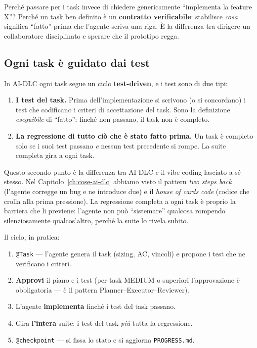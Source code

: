 Perché passare per i task invece di chiedere genericamente ``implementa la feature X''? Perché un task ben definito è un \textbf{contratto verificabile}: stabilisce \textit{cosa} significa ``fatto'' prima che l'agente scriva una riga. È la differenza tra dirigere un collaboratore disciplinato e sperare che il prototipo regga.

\subsection*{Ogni task è guidato dai test}

In AI-DLC ogni task segue un ciclo \textbf{test-driven}, e i test sono di due tipi:

\begin{enumerate}
  \item \textbf{I test del task.} Prima dell'implementazione si scrivono (o si concordano) i test che codificano i criteri di accettazione del task. Sono la definizione \textit{eseguibile} di ``fatto'': finché non passano, il task non è completo.
  \item \textbf{La regressione di tutto ciò che è stato fatto prima.} Un task è completo solo se i suoi test passano \textit{e} nessun test precedente si rompe. La suite completa gira a ogni task.
\end{enumerate}

Questo secondo punto è la differenza tra AI-DLC e il vibe coding lasciato a sé stesso. Nel Capitolo~\ref{ch:cose-ai-dlc} abbiamo visto il pattern \textit{two steps back} (l'agente corregge un bug e ne introduce due) e il \textit{house of cards code} (codice che crolla alla prima pressione). La regressione completa a ogni task è proprio la barriera che li previene: l'agente non può ``sistemare'' qualcosa rompendo silenziosamente qualcos'altro, perché la suite lo rivela subito.

Il ciclo, in pratica:

\begin{enumerate}
  \item \texttt{@Task} --- l'agente genera il task (sizing, AC, vincoli) e propone i test che ne verificano i criteri.
  \item \textbf{Approvi} il piano e i test (per task MEDIUM o superiori l'approvazione è obbligatoria --- è il pattern Planner--Executor--Reviewer).
  \item L'agente \textbf{implementa} finché i test del task passano.
  \item Gira \textbf{l'intera} suite: i test del task \textit{più} tutta la regressione.
  \item \texttt{@checkpoint} --- si fissa lo stato e si aggiorna \texttt{PROGRESS.md}.
\end{enumerate}

